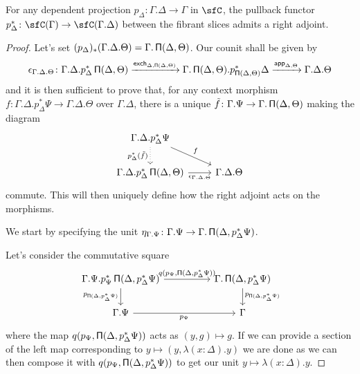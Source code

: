 \begin{lem}\label{radj}
  For any dependent projection $p_\Delta\colon\Gamma.\Delta\rightarrow\Gamma$ in
  $\sfC$, the pullback functor
  $p_\Delta^*\colon\sfC(\Gamma)\rightarrow\sfC(\Gamma.\Delta)$ between the
  fibrant slices admits a right adjoint.
\end{lem}
\begin{proof}
  Let's set $(p_\Delta)_*(\Gamma.\Delta.\Theta)=\Gamma.\operatorname{\mathsf{\Pi}}(\Delta,\Theta)$. Our
  counit shall be given by
  \[\epsilon_{\Gamma.\Delta.\Theta}\colon\Gamma.\Delta.p^*_\Delta\operatorname{\mathsf{\Pi}}(\Delta,\Theta)
  \xrightarrow{\operatorname{\mathsf{exch}}_{\Delta,\operatorname{\mathsf{\Pi}}(\Delta,\Theta)}}\Gamma.\operatorname{\mathsf{\Pi}}(\Delta,\Theta).p^*_{\operatorname{\mathsf{\Pi}}(\Delta,\Theta)}\Delta
  \xrightarrow{\operatorname{\mathsf{app}}_{\Delta,\Theta}}\Gamma.\Delta.\Theta\]
  and it is then sufficient to prove that, for any context morphism
  $f\colon\Gamma.\Delta.p^*_\Delta\Psi\rightarrow\Gamma.\Delta.\Theta$ over
  $\Gamma.\Delta$, there is
  a unique $\tilde{f}\colon\Gamma.\Psi\rightarrow\Gamma.\operatorname{\mathsf{\Pi}}(\Delta,\Theta)$
  making the diagram
  \[\begin{tikzcd}
    {\Gamma.\Delta.p^*_\Delta\Psi} \\
    {\Gamma.\Delta.p^*_\Delta\Pis(\Delta,\Theta)} & {\Gamma.\Delta.\Theta}
    \arrow["f", from=1-1, to=2-2]
    \arrow["{\epsilon_{\Gamma.\Delta.\Theta}}"', from=2-1, to=2-2]
    \arrow["{p^*_\Delta(\tilde{f})}"', dotted, from=1-1, to=2-1]
  \end{tikzcd}\]
  commute. This will then uniquely define how the right adjoint acts on the
  morphisms.

\noindent
  We start by specifying the unit
  $\eta_{\Gamma.\Psi}\colon\Gamma.\Psi\rightarrow\Gamma.\operatorname{\mathsf{\Pi}}(\Delta,p^*_{\Delta}\Psi)$.

\noindent
  Let's consider the commutative square
  \[\begin{tikzcd}[column sep=huge]
    {\Gamma.\Psi.p^*_\Psi\Pis(\Delta,p^*_\Delta\Psi)} & {\Gamma.\Pis(\Delta,p^*_\Delta\Psi)} \\
    {\Gamma.\Psi} & \Gamma
    \arrow["{p_{\Pis(\Delta,p^*_\Delta\Psi)}}"', from=1-1, to=2-1]
    \arrow["{p_{\Psi}}"', from=2-1, to=2-2]
    \arrow["{p_{\Pis(\Delta,p^*_\Delta\Psi)}}", from=1-2, to=2-2]
    \arrow["{q(p_\Psi,\Pis(\Delta,p^*_\Delta\Psi))}", from=1-1, to=1-2]
  \end{tikzcd}\]
  where the map $q(p_\Psi,\operatorname{\mathsf{\Pi}}(\Delta,p^*_\Delta\Psi))$ acts as $(y,g)\mapsto
  g$. If we can provide a section of the left map
  corresponding to $y\mapsto(y,\lambda(x:\Delta).y)$ we are
  done as we can then compose
  it with $q(p_\Psi,\operatorname{\mathsf{\Pi}}(\Delta,p^*_\Delta\Psi))$ to get our unit
  $y\mapsto\lambda(x:\Delta).y$.
  

\end{proof}
